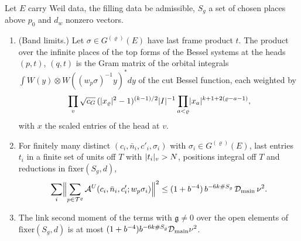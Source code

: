\begin{theorem}\label{thm:main-term}
Let $E$ carry Weil data, the filling data be admissible, $S_g$ a set of chosen places above $p_0$ and $d_w$ nonzero vectors.
\begin{enumerate}[label=\textup{(\alph*)}]
\item (Band limits.) Let $\sigma\in G^{(\varrho)}(E)$ have last frame product $t$. The product over the infinite places of the top forms of the Bessel systems at the heads $(p,t)$, $(q,t)$ is the
Gram matrix of the orbital integrals $\int W(y)\otimes W((w_p\sigma)^{-1}y)^*dy$ of the cut Bessel function, each weighted by
\[
  \prod_v\sqrt{c_G}\,(\lvert x_\varrho\rvert^2-1)^{(k-1)/2}\lvert I\rvert^{-1}\prod_{a<\varrho}\lvert x_a\rvert^{k+1+2(\varrho-a-1)},
\]
with $x$ the scaled entries of the head at $v$.
\item For finitely many distinct $(c_i,\bar n_i,c'_i,\sigma_i)$ with $\sigma_i\in G^{(\varrho)}(E)$, last entries $t_i$ in a finite set of units off $T$ with $\lvert t_i\rvert_v>N$, positions integral off $T$ and reductions in
$\mathrm{fixer}(S_g,d)$,
\[
  \sum_i\Bigl\|\sum_{p\in\mathcal T^\varrho}\mathcal A^U(c_i,\bar n_i,c'_i;w_p\sigma_i)\Bigr\|^2\le(1+b^{-4})\,b^{-6k\#S_g}\,\mathcal D_{\rm main}\,\nu^2.
\]
\item The link second moment of the terms with $\mathfrak g\ne0$ over the open elements of $\mathrm{fixer}(S_g,d)$ is at most $(1+b^{-4})b^{-6k\#S_g}\mathcal D_{\rm main}\nu^2$.
\end{enumerate}
\end{theorem}

